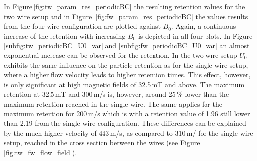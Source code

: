 In Figure\,\ref{fig:tw_param_res_periodicBC} the resulting retention values for the two wire setup and in Figure \,\ref{fig:fw_param_res_periodicBC} the values results from the four wire configuration are plotted against $B_{0}$. Again, a continuous increase of the retention with increasing $B_{0}$ is depicted in all four plots. In Figure \ref{subfig:tw_periodicBC_U0_var} and \ref{subfig:fw_periodicBC_U0_var} an almost exponential increase can be observed for the retention. In the two wire setup $U_{0}$ exhibits the same influence on the particle retention as for the single wire setup, where a higher flow velocity leads to higher retention times. This effect, however, is only significant at high magnetic fields of 32.5\,mT and above. The maximum retention at 32.5\,mT and 300\,\textmu m/s is, however, around 25\,\% lower than the maximum retention reached in the single wire. The same applies for the maximum retention for 200\,\textmu m/s which is with a retention value of 1.96 still lower than 2.19 from the single wire configuration. These differences can be explained by the much higher velocity of 443\,\textmu m/s, as compared to 310\,\textmu m/ for the single wire setup, reached in the cross section between the wires (see Figure \ref{fig:tw_fw_flow_field}).

